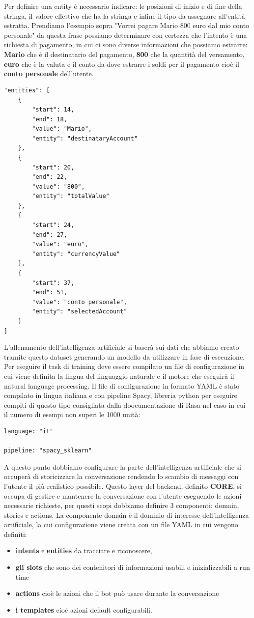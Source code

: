 Per definire una entity è necessario indicare: le posizioni di inizio e di fine della stringa, il valore effettivo che ha la stringa e infine il tipo da assegnare all'entità estratta.
Prendiamo l'esempio sopra "Vorrei pagare Mario 800 euro dal mio conto personale" da questa frase possiamo determinare con certezza che l'intento è una richiesta di pagamento, in cui ci sono diverse informazioni che possiamo estrarre: \textbf{Mario} che è il destinatario del pagamento, \textbf{800} che la quantità del versamento, \textbf{euro} che è la valuta e il conto da dove estrarre i soldi per il pagamento cioè il \textbf{conto personale} dell'utente.
\begin{lstlisting}
"entities": [
    {
        "start": 14,
        "end": 18,
        "value": "Mario",
        "entity": "destinataryAccount"
    },
    {
        "start": 20,
        "end": 22,
        "value": "800",
        "entity": "totalValue"
    },
    {
        "start": 24,
        "end": 27,
        "value": "euro",
        "entity": "currencyValue"
    },
    {
        "start": 37,
        "end": 51,
        "value": "conto personale",
        "entity": "selectedAccount"
    }
]
\end{lstlisting}
L'allenamento dell'intelligenza artificiale si baserà sui dati che abbiamo creato tramite questo dataset generando un modello da utilizzare in fase di esecuzione. Per eseguire il task di training deve essere compilato un file di configurazione in cui viene definita la lingua del linguaggio naturale e il motore che eseguirà il natural language processing.
Il file di configurazione in formato YAML è stato compilato in lingua italiana e con pipeline Spacy, libreria python per eseguire compiti di questo tipo consigliata dalla doocumentazione di Rasa nel caso in cui il numero di esempi non superi le 1000 unità:
\begin{lstlisting}
language: "it"

pipeline: "spacy_sklearn"
\end{lstlisting}
A questo punto dobbiamo configurare la parte dell'intelligenza artificiale che si occuperà di storicizzare la conversazione rendendo lo scambio di messaggi con l'utente il più realistico possibile.
Questo layer del backend, definito \textbf{CORE}, si occupa di gestire e mantenere la conversazione con l'utente eseguendo le azioni necessarie richieste, per questi scopi dobbiamo definire 3 componenti: domain, stories e actions.
La componente domain è il dominio di interesse dell'intelligenza artificiale, la cui configurazione viene creata con un file YAML in cui vengono definiti: \begin{itemize}
\item \textbf{intents} e \textbf{entities} da tracciare e riconoscere,
\item \textbf{gli slots} che sono dei contenitori di informazioni usabili e inizializzabili a run time
\item \textbf{actions} cioè le azioni che il bot può usare durante la conversazione
\item \textbf{i templates} cioè azioni default configurabili.
\end{itemize}
